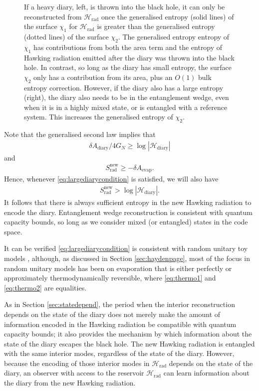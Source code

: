 \documentclass[11pt,a4paper]{article}
\begin{document}
\begin{figure}[t]
\begin{subfigure}{.48\textwidth}
\end{subfigure}
\centering
\caption{If a heavy diary, left, is thrown into the black hole, it can only be reconstructed from $\mathcal{H}_\text{rad}$ once the generalised entropy (solid lines) of the surface $\chi_1$ for $\mathcal{H}_\text{rad}$ is greater than the generalised entropy (dotted lines) of the surface $\chi_2$. The generalised entropy entropy of $\chi_1$ has contributions from both the area term and the entropy of Hawking radiation emitted after the diary was thrown into the black hole. In contrast, so long as the diary has small entropy, the surface $\chi_2$ only has a contribution from its area, plus an $O(1)$ bulk entropy correction. However, if the diary also has a large entropy (right), the diary also needs to be in the entanglement wedge, even when it is in a highly mixed state, or is entangled with a reference system. This increases the generalised entropy of $\chi_2$.}
\label{fig:largediaryevap}
\end{figure}

Note that the generalised second law implies that 
\begin{align} \label{eq:thermo1}
\delta A_\text{diary}/ 4G_N \geq \log |\mathcal{H}_\text{diary}|
\end{align}
 and 
\begin{align} \label{eq:thermo2}
 S_\text{rad}^\text{new} \geq -\delta A_\text{evap}.
 \end{align}
Hence, whenever  \eqref{eq:largediarycondition} is satisfied, we will also have
\begin{align}
S_\text{rad}^\text{new} > \log |\mathcal{H}_\text{diary}|.
\end{align}
It follows that there is always sufficient entropy in the new Hawking radiation to encode the diary. Entanglement wedge reconstruction is consistent with quantum capacity bounds, so long as we consider mixed (or entangled) states in the code space.

It can be verified \eqref{eq:largediarycondition} is consistent with random unitary toy models \cite{hayden2018learning}, although, as discussed in Section \ref{sec:haydenpage}, most of the focus in random unitary models has been on evaporation that is either perfectly or approximately thermodynamically reversible, where \eqref{eq:thermo1} and \eqref{eq:thermo2} are equalities.

As in Section \ref{sec:statedepend}, the period when the interior reconstruction depends on the state of the diary does not merely make the amount of information encoded in the Hawking radiation be compatible with quantum capacity bounds; it also provides the mechanism by which information about the state of the diary escapes the black hole. The new Hawking radiation is entangled with the same interior modes, regardless of the state of the diary. However, because the encoding of those interior modes in $\mathcal{H}_\text{rad}$ depends on the state of the diary, an observer with access to the reservoir $\mathcal{H}_\text{rad}$ can learn information about the diary from the new Hawking radiation.
\end{document}
